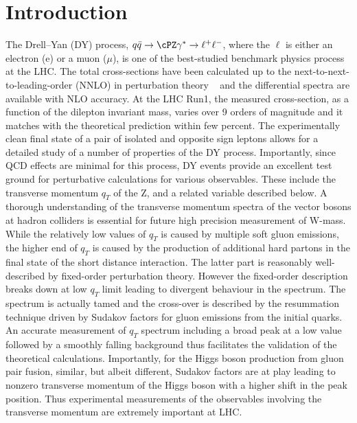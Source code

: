 \section{Introduction}
\label{sec:introduction}


The Drell--Yan (DY) process, $q\bar q \rightarrow \cPZ\gamma^{*} \to \ell^+\ell^-$, where the $\ell$  is either an electron (e) or a muon ($\mu$), is one of the best-studied benchmark physics process at the LHC. The total  cross-sections have been calculated up to the next-to-next-to-leading-order (NNLO) in perturbation theory ~\cite{Anastasiou:2003ds,Melnikov:2006kv} and the differential spectra are available with NLO accuracy. At the LHC Run1, the measured cross-section, as a function of the dilepton invariant mass, varies over 9 orders of magnitude and it matches with the theoretical prediction within few percent. The experimentally clean final state of a pair of isolated and opposite sign leptons allows for a detailed study of a number of properties of the DY process. Importantly, since QCD effects are minimal for this process, DY events provide an excellent test ground for perturbative calculations for various observables. These include the  transverse momentum $q_T$ of the Z, and a related variable \phistar described below. A thorough understanding of the transverse momentum spectra of the vector bosons at hadron colliders is essential for future high precision measurement of W-mass. While the relatively low values of $q_T$ is caused by multiple soft gluon emissions, the  higher end of $q_T$ is caused by the production of additional hard partons in the final state of the short distance interaction. The latter part is reasonably well-described by fixed-order perturbation theory. However the fixed-order description  breaks down at  low $q_T$ limit leading to divergent behaviour  in the spectrum. The spectrum is actually tamed and the cross-over is described by the resummation technique driven by Sudakov factors for gluon emissions from the initial quarks. An accurate measurement of $q_T$ spectrum including a broad peak at a low value followed by a smoothly falling background thus facilitates the validation of the theoretical calculations. Importantly, for the Higgs boson production from gluon pair fusion, similar, but albeit different, Sudakov factors are at play leading to nonzero transverse momentum of the Higgs boson with a higher shift in the peak position. Thus experimental measurements of the observables involving the transverse momentum are extremely important at LHC. %

